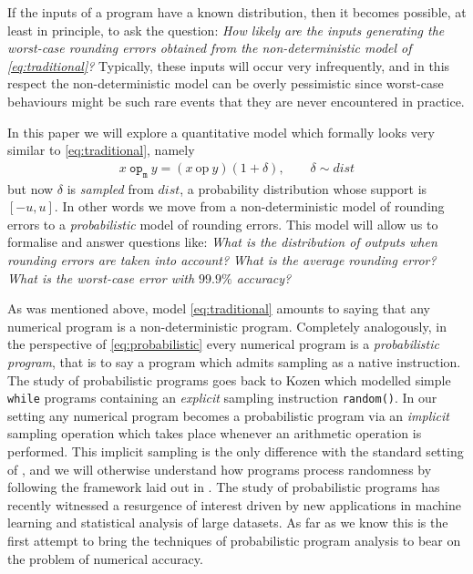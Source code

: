 \documentclass[10pt,conference]{IEEEtran}
\newcommand{\mop}{~\mathtt{op_m}~}
\newcommand{\iop}{~\mathrm{op}~}
\begin{document}
If the inputs of a program have a known distribution, then it becomes possible, at least in principle, to ask the question: \textit{How likely are the inputs generating the worst-case rounding errors obtained from the non-deterministic model of \cref{eq:traditional}?} Typically, these inputs will occur very infrequently, and in this respect the non-deterministic model can be overly pessimistic since worst-case behaviours might be such rare events that they are never encountered in practice. 

In this paper we will explore a quantitative model which formally looks very similar to \cref{eq:traditional}, namely
\begin{align}
x\mop y=(x\iop y)(1+\delta), \qquad\delta\sim dist \label{eq:probabilistic}
\end{align}
but now $\delta$ is \emph{sampled} from $dist$, a probability distribution whose support is $\left[-u,u\right]$. In other words we move from a non-deterministic model of rounding errors to a \emph{probabilistic} model of rounding errors. This model will allow us to formalise and answer questions like: \textit{What is the distribution of outputs when rounding errors are taken into account?} \textit{What is the average rounding error?} \textit{What is the worst-case error with $99.9\%$ accuracy?}

As was mentioned above, model \eqref{eq:traditional} amounts to saying that any numerical program is a non-deterministic program. Completely analogously, in the perspective of \cref{eq:probabilistic} every numerical program is a \emph{probabilistic program}, that is to say a program which admits sampling as a native instruction. The study of probabilistic programs goes back to Kozen \cite{K81c} which modelled simple \texttt{while} programs containing an \emph{explicit} sampling instruction \texttt{random()}. In our setting any numerical program becomes a probabilistic program via an \emph{implicit} sampling operation which takes place whenever an arithmetic operation is performed. This implicit sampling is the only difference with the standard setting of \cite{K81c}, and we will otherwise understand how programs process randomness by following the framework laid out in \cite{K81c}. The study of probabilistic programs has recently witnessed a resurgence of interest driven by new applications in machine learning and statistical analysis of large datasets. As far as we know this is the first attempt to bring the techniques of probabilistic program analysis to bear on the problem of numerical accuracy.
\end{document}
